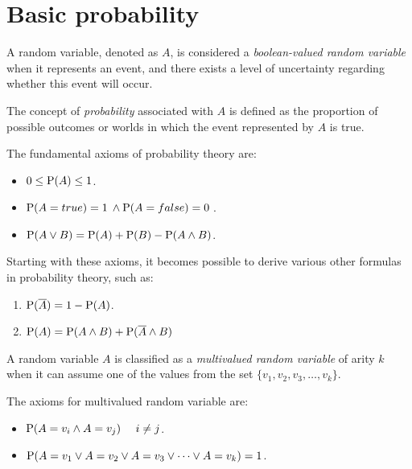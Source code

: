 \documentclass[12pt, a4paper]{report}
\begin{document}
    \section{Basic probability}
    \begin{definition}
        A random variable, denoted as $A$, is considered a \emph{boolean-valued random variable} when it represents an event, and there exists a level of uncertainty regarding whether this event will occur.

        The concept of \emph{probability} associated with $A$ is defined as the proportion of possible outcomes or worlds in which the event represented by $A$ is true.    
    \end{definition}
    \begin{theorem}
        The fundamental axioms of probability theory are: 
        \begin{itemize}
            \item $0 \leq \textnormal{P}(A) \leq 1$. 
            \item $\textnormal{P}(A=true) = 1 \: \land \textnormal{P}(A=false) = 0\: $. 
            \item $\textnormal{P}(A \lor B)=\textnormal{P}(A)+\textnormal{P}(B)-\textnormal{P}(A \land B)$.
        \end{itemize}
    \end{theorem}
    Starting with these axioms, it becomes possible to derive various other formulas in probability theory, such as:
    \begin{enumerate}
        \item $\textnormal{P}(\overline{A})=1-\textnormal{P}(A)$.
        \item $\textnormal{P}(A)=\textnormal{P}(A \land B)+\textnormal{P}(\overline{A} \land B)$
    \end{enumerate}
    \begin{definition}
        A random variable $A$ is classified as a \emph{multivalued random variable} of arity $k$ when it can assume one of the values from the set $\{v_1, v_2, v_3, \dots, v_k\}$. 
    \end{definition}
    \begin{theorem}
        The axioms for multivalued random variable are: 
        \begin{itemize}
            \item $\textnormal{P}(A=v_i \land A=v_j) \:\:\:\:\:\: i \neq j$. 
            \item $\textnormal{P}(A=v_1 \lor A=v_2 \lor A=v_3 \lor \dots \lor A=v_k)=1$. 
        \end{itemize}
    \end{theorem}
\end{document}
